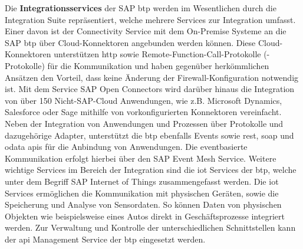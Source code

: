 Die \textbf{Integrationsservices} der SAP \ac{btp} werden im Wesentlichen durch die Integration Suite repräsentiert, welche mehrere Services zur Integration umfasst. Einer davon ist der Connectivity Service mit dem On-Premise Systeme an die SAP \ac{btp} über Cloud-Konnektoren angebunden werden können. \autocite[Vgl.][]{CLOUDCONNECTOR} Diese Cloud-Konnektoren unterstützen \ac{http} sowie Remote-Function-Call-Protokolle (-Protokolle) für die Kommunikation und haben gegenüber herkömmlichen Ansätzen den Vorteil, dass keine Änderung der Firewall-Konfiguration notwendig ist. Mit dem Service SAP Open Connectors wird darüber hinaus die Integration von über 150 Nicht-SAP-Cloud Anwendungen, wie z.B. Microsoft Dynamics, Salesforce oder Sage mithilfe von vorkonfigurierten Konnektoren vereinfacht. \autocite[Vgl.][S. 28]{INTEGRATIONSUITE2023} Neben der Integration von Anwendungen und Prozessen über Protokolle und dazugehörige Adapter, unterstützt die \ac{btp} ebenfalls Events sowie \ac{rest}, \ac{soap} und \ac{odata} \ac{api}s für die Anbindung von Anwendungen. \autocite[Vgl.][]{BTPAPIS2023} Die eventbasierte Kommunikation erfolgt hierbei über den SAP Event Mesh Service.  \autocite[Vgl.][S. 4]{EVENTMESH2022} Weitere wichtige Services im Bereich der Integration sind die \ac{iot} Services der \ac{btp}, welche unter dem Begriff SAP Internet of Things zusammengefasst werden. \autocite[Vgl.][S. 163]{SEUBERT} Die \ac{iot} Services ermöglichen die Kommunikation mit physischen Geräten, sowie die Speicherung und Analyse von Sensordaten. So können Daten von physischen Objekten wie beispielsweise eines Autos direkt in Geschäftsprozesse integriert werden. \autocite[Vgl.][]{IOTBTP2023} Zur Verwaltung und Kontrolle der unterschiedlichen Schnittstellen kann der \ac{api} Management Service der \ac{btp} eingesetzt werden. \autocite[Vgl.][S. 72]{SEUBERT} 

